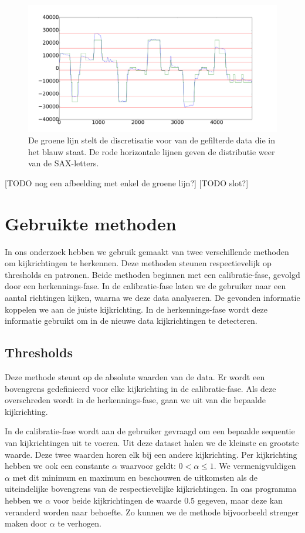 \documentclass{article}
\begin{document}
\begin{figure}[h]
\centering
\includegraphics[width=\linewidth]{images/discretized_data}
\caption{De groene lijn stelt de discretisatie voor van de gefilterde data die in het blauw staat. De rode horizontale lijnen geven de distributie weer van de SAX-letters.}
\end{figure}

[TODO nog een afbeelding met enkel de groene lijn?]
[TODO slot?]

\section{Gebruikte methoden}

In ons onderzoek hebben we gebruik gemaakt van twee verschillende methoden om kijkrichtingen te herkennen. Deze methoden steunen respectievelijk op thresholds en patronen. Beide methoden beginnen met een calibratie-fase, gevolgd door een herkennings-fase. In de calibratie-fase laten we de gebruiker naar een aantal richtingen kijken, waarna we deze data analyseren. De gevonden informatie koppelen we aan de juiste kijkrichting. In de herkennings-fase wordt deze informatie gebruikt om in de nieuwe data kijkrichtingen te detecteren.

\subsection{Thresholds}

Deze methode steunt op de absolute waarden van de data. Er wordt een bovengrens gedefinieerd voor elke kijkrichting in de calibratie-fase. Als deze overschreden wordt in de herkennings-fase, gaan we uit van die bepaalde kijkrichting.

In de calibratie-fase wordt aan de gebruiker gevraagd om een bepaalde sequentie van kijkrichtingen uit te voeren. Uit deze dataset halen we de kleinste en grootste waarde. Deze twee waarden horen elk bij een andere kijkrichting. Per kijkrichting hebben we ook een constante $\alpha$ waarvoor geldt: $0 < \alpha \leq 1$. We vermenigvuldigen $\alpha$ met dit minimum en maximum en beschouwen de uitkomsten als de uiteindelijke bovengrens van de respectievelijke kijkrichtingen. In ons programma hebben we $\alpha$ voor beide kijkrichtingen de waarde $0.5$ gegeven, maar deze kan veranderd worden naar behoefte. Zo kunnen we de methode bijvoorbeeld strenger maken door $\alpha$ te verhogen.
\end{document}
